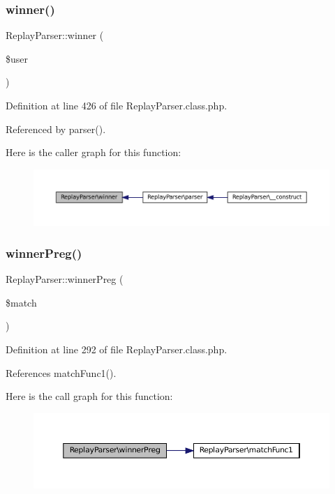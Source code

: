 \subsubsection{\texorpdfstring{winner()}{winner()}}
{\footnotesize\ttfamily Replay\+Parser\+::winner (\begin{DoxyParamCaption}\item[{}]{\$user }\end{DoxyParamCaption})}



Definition at line 426 of file Replay\+Parser.\+class.\+php.



Referenced by parser().

Here is the caller graph for this function\+:\nopagebreak
\begin{figure}[H]
\begin{center}
\leavevmode
\includegraphics[width=350pt]{class_replay_parser_a68b9a6f8d99c70c8e6cef889ebe50e3c_icgraph}
\end{center}
\end{figure}
\mbox{\label{class_replay_parser_ae196d3d060e95dfe63e91afe4da55f15}} 
\subsubsection{\texorpdfstring{winner\+Preg()}{winnerPreg()}}
{\footnotesize\ttfamily Replay\+Parser\+::winner\+Preg (\begin{DoxyParamCaption}\item[{}]{\$match }\end{DoxyParamCaption})}



Definition at line 292 of file Replay\+Parser.\+class.\+php.



References match\+Func1().

Here is the call graph for this function\+:\nopagebreak
\begin{figure}[H]
\begin{center}
\leavevmode
\includegraphics[width=350pt]{class_replay_parser_ae196d3d060e95dfe63e91afe4da55f15_cgraph}
\end{center}
\end{figure}


